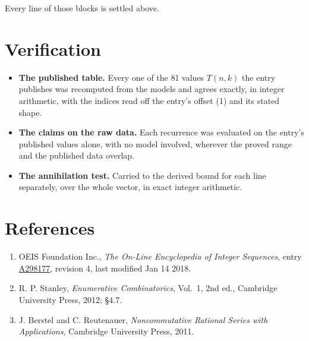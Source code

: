 \documentclass[11pt]{article}
\theoremstyle{definition}
\begin{document}
Every line of those blocks is settled above.

\section{Verification}

\begin{itemize}

\item {\bfseries The published table.} Every one of the 81 values $T(n,k)$ the entry publishes was recomputed from the models and agrees exactly, in integer arithmetic, with the indices read off the entry's offset (1) and its stated shape.

\item {\bfseries The claims on the raw data.} Each recurrence was evaluated on the entry's published values alone, with no model involved, wherever the proved range and the published data overlap.

\item {\bfseries The annihilation test.} Carried to the derived bound for each line separately, over the whole vector, in exact integer arithmetic.

\end{itemize}

\section{References}

\begin{enumerate}

\item OEIS Foundation Inc., \emph{The On-Line Encyclopedia of Integer Sequences}, entry \href{https://oeis.org/A298177}{A298177}, revision 4, last modified Jan 14 2018.

\item R. P. Stanley, \emph{Enumerative Combinatorics}, Vol.~1, 2nd ed., Cambridge University Press, 2012; \S4.7.

\item J. Berstel and C. Reutenauer, \emph{Noncommutative Rational Series with Applications}, Cambridge University Press, 2011.

\end{enumerate}
\end{document}
